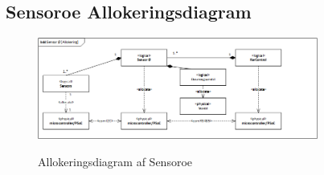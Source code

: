 \subsection{Sensoroe Allokeringsdiagram}

\begin{figure}[H]
	\centering
	\includegraphics[width=0.82\textwidth]{Systemarkitektur/Sensoroe/Sensoroe_Allokeringsdiagram.png}
	\label{fig:Sensoroe BDD}
	\caption{Allokeringsdiagram af Sensoroe}
\end{figure}
